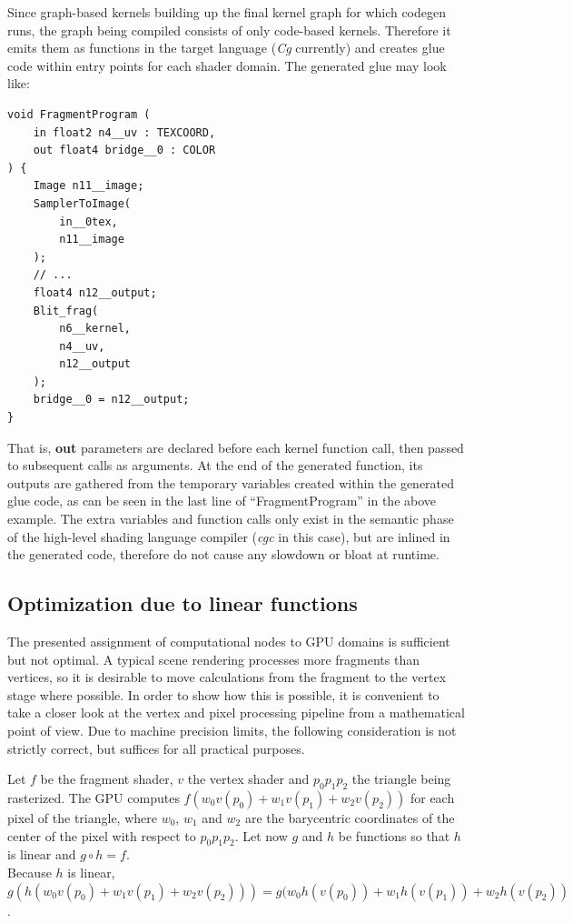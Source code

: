 Since graph-based kernels building up the final kernel graph for which codegen runs, the graph being compiled consists of only code-based kernels. Therefore it emits them as functions in the target language (\emph{Cg} currently) and creates glue code within entry points for each shader domain. The generated glue may look like:

\noindent\begin{minipage}{\textwidth}
\begin{lstlisting}[frame=single]
void FragmentProgram (
	in float2 n4__uv : TEXCOORD,
	out float4 bridge__0 : COLOR
) {
	Image n11__image;
	SamplerToImage(
		in__0tex,
		n11__image
	);
	// ...
	float4 n12__output;
	Blit_frag(
		n6__kernel,
		n4__uv,
		n12__output
	);
	bridge__0 = n12__output;
}
\end{lstlisting}
\end{minipage}

That is, \textbf{out} parameters are declared before each kernel function call, then passed to subsequent calls as arguments. At the end of the generated function, its outputs are gathered from the temporary variables created within the generated glue code, as can be seen in the last line of ``FragmentProgram'' in the above example. The extra variables and function calls only exist in the semantic phase of the high-level shading language compiler (\emph{cgc} in this case), but are inlined in the generated code, therefore do not cause any slowdown or bloat at runtime.

\subsection{Optimization due to linear functions}

The presented assignment of computational nodes to GPU domains is sufficient but not optimal. A typical scene rendering processes more fragments than vertices, so it is desirable to move calculations from the fragment to the vertex stage where possible. In order to show how this is possible, it is convenient to take a closer look at the vertex and pixel processing pipeline from a mathematical point of view. Due to machine precision limits, the following consideration is not strictly correct, but suffices for all practical purposes.

Let $f$ be the fragment shader, $v$ the vertex shader and $p_0 p_1 p_2$ the triangle being rasterized. The GPU computes $f(w_0 v(p_0) + w_1 v(p_1) + w_2 v(p_2))$ for each pixel of the triangle, where $w_0$, $w_1$ and $w_2$ are the barycentric coordinates of the center of the pixel with respect to $p_0 p_1 p_2$. Let now $g$ and $h$ be functions so that $h$ is linear and $g \circ h = f$. \\
Because $h$ is linear, \\
$g(h(w_0 v(p_0) + w_1 v(p_1) + w_2 v(p_2))) = g(w_0 h(v(p_0)) + w_1 h(v(p_1)) + w_2 h(v(p_2))$.

